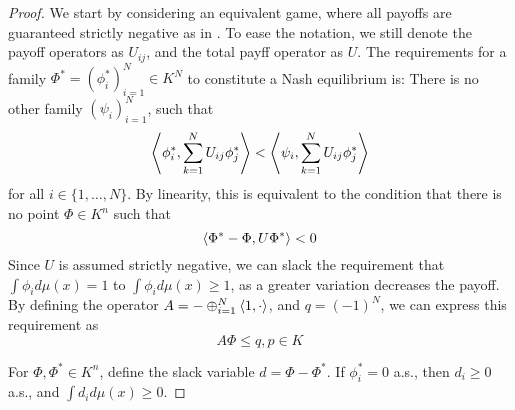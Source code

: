 \begin{proof}
		We start by considering an equivalent game, where all payoffs are guaranteed strictly negative as in . To ease the notation, we still denote the payoff operators as $U_{ij}$, and the total payff operator as $U$.
    The requirements for a family $\Phi^*=(\phi_i^*)_{i=1}^N \in K^N$ to constitute a Nash equilibrium is: There is no other family $(\psi_i)_{i=1}^N$, such that
    \begin{equation}
        \ip{\phi_i^*}{\sum_{k=1}^N U_{ij} \phi_j^*} < \ip{\psi_i}{\sum_{k=1}^N U_{ij} \phi_j^*}
    \end{equation}
    for all $i\in \{1,\dots,N\}$.
    By linearity, this is equivalent to the condition that there is no point $\Phi \in K^n$ such that
    \begin{equation}
      \left \langle \Phi^*-\Phi,U \Phi^* \right \rangle < 0
    \end{equation}
		Since $U$ is assumed strictly negative, we can slack the requirement that $\int \phi_i d\mu(x)=1$ to $\int \phi_i d\mu(x) \geq 1$, as a greater variation decreases the payoff. By defining the operator $A=-\oplus_{i=1}^N \left \langle 1,\cdot \right \rangle$, and $q = (-1)^N$, we can express this requirement as
		\begin{equation}
			\label{eq:constraint}
			A \Phi \leq q, p \in K
		\end{equation}

    For $\Phi, \Phi^* \in K^n$, define the slack variable $d = \Phi - \Phi^*$. If $\phi_i^* = 0$ a.s., then $d_i \geq 0$ a.s., and $\int d_i d\mu(x) \geq 0$.


\end{proof}
